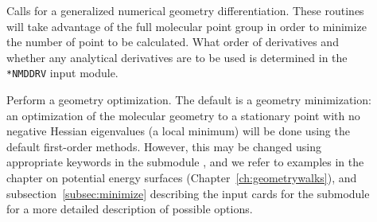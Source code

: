 \begin{description}
\item[] Calls for a generalized numerical geometry
differentiation. These routines will take advantage of the full
molecular point group in order to minimize the number of point to be
calculated. What order of derivatives and whether any analytical
derivatives are to be used is determined in the \verb|*NMDDRV| input
module.

\item[] Perform a geometry optimization.
The default is a geometry minimization:
an optimization of the molecular geometry to a stationary point with no
negative Hessian eigenvalues
(a local minimum) will be done using the default first-order
methods. However, this may be changed using appropriate
keywords in the submodule , and we refer to examples in
the chapter on potential energy surfaces
(Chapter~\ref{ch:geometrywalks}), and subsection~\ref{subsec:minimize}
describing the input cards for the  submodule for a more
detailed description of possible options.


%


\end{description}
